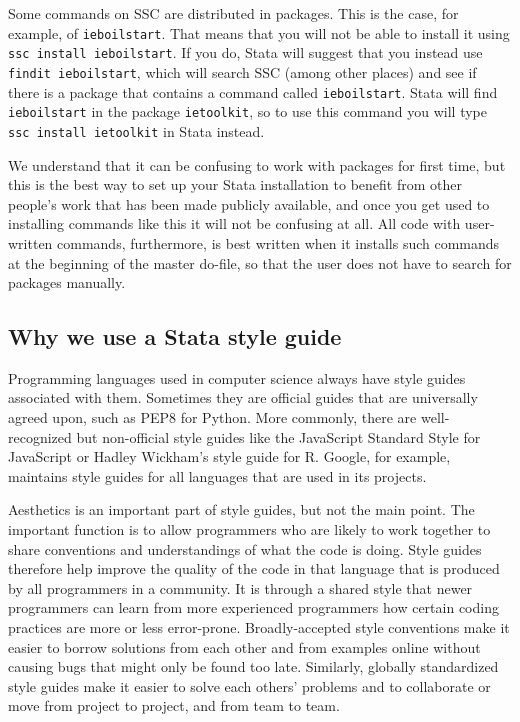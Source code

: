 Some commands on SSC are distributed in packages.
This is the case, for example, of \texttt{ieboilstart}.
That means that you will not be able to install it using \texttt{ssc install ieboilstart}.
If you do, Stata will suggest that you instead use \texttt{findit ieboilstart},
which will search SSC (among other places) and see if there is a
package that contains a command called \texttt{ieboilstart}.
Stata will find \texttt{ieboilstart} in the package \texttt{ietoolkit},
so to use this command you will type \texttt{ssc install ietoolkit} in Stata instead.

We understand that it can be confusing to work with packages for first time,
but this is the best way to set up your Stata installation to benefit from other
people's work that has been made publicly available,
and once you get used to installing commands like this it will not be confusing at all.
All code with user-written commands, furthermore, is best written when it installs such commands
at the beginning of the master do-file,
so that the user does not have to search for packages manually.

\subsection{Why we use a Stata style guide}

Programming languages used in computer science always have style guides associated with them.
Sometimes they are official guides that are universally agreed upon, such as PEP8 for
Python. More commonly, there are well-recognized but
non-official style guides like the JavaScript Standard Style for
JavaScript or Hadley Wickham's style guide for R.
Google, for example, maintains style guides for all languages
that are used in its projects.

Aesthetics is an important part of style guides, but not the main point.
The important function is to allow programmers who are likely to work together
to share conventions and understandings of what the code is doing.
Style guides therefore help improve the quality of the code
in that language that is produced by all programmers in a community.
It is through a shared style that newer programmers can learn from more experienced programmers
how certain coding practices are more or less error-prone.
Broadly-accepted style conventions make it easier to borrow solutions
from each other and from examples online
without causing bugs that might only be found too late.
Similarly, globally standardized style guides make it easier to solve each others'
problems and to collaborate or move from project to project, and from team to team.

